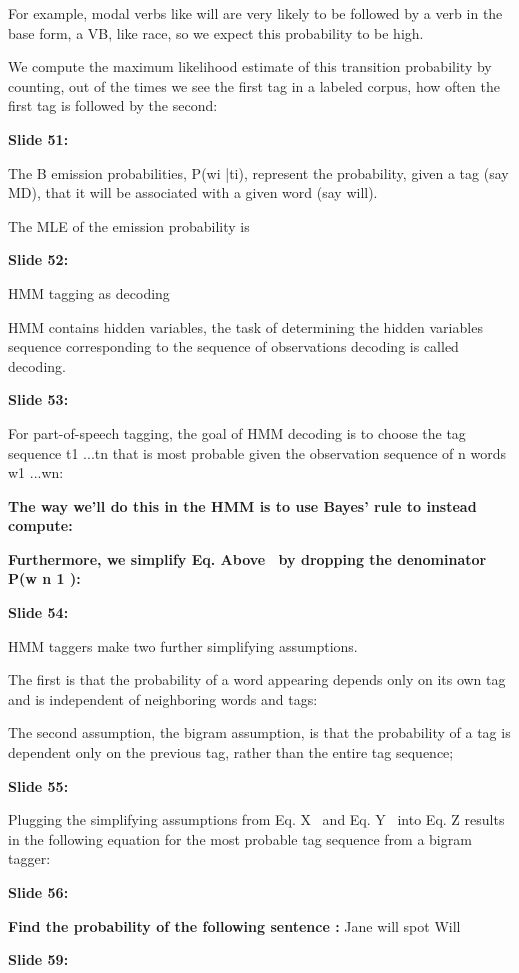 \documentclass[11pt,a4paper]{article}
\begin{document}
For example, modal verbs like will are very likely to be followed by a verb in the base form, a VB, like race, so we expect this probability to be high.

We compute the maximum likelihood estimate of this transition probability by counting, out of the times we see the first tag in a labeled corpus, how often the first tag is followed by the second:

\textbf{Slide 51:}

The B emission probabilities, P(wi |ti), represent the probability, given a tag (say MD), that it will be associated with a given word (say will).

The MLE of the emission probability is

\textbf{Slide 52:}

HMM tagging as decoding

HMM contains hidden variables, the task of determining the hidden variables sequence corresponding to the sequence of observations decoding is called decoding.

\textbf{Slide 53:}

For part-of-speech tagging, the goal of HMM decoding is to choose the tag sequence t1 ...tn that is most probable given the observation sequence of n words w1 ...wn:

\textbf{The way we’ll do this in the HMM is to use Bayes’ rule to instead compute:} 

\textbf{Furthermore, we simplify Eq. Above  by dropping the denominator P(w n 1 ):} 

\textbf{Slide 54:}

HMM taggers make two further simplifying assumptions.

The first is that the probability of a word appearing depends only on its own tag and is independent of neighboring words and tags:

The second assumption, the bigram assumption, is that the probability of a tag is dependent only on the previous tag, rather than the entire tag sequence;

\textbf{Slide 55:}

Plugging the simplifying assumptions from Eq. X  and Eq. Y  into Eq. Z results in the following equation for the most probable tag sequence from a bigram tagger:

\textbf{Slide 56:}

\textbf{Find the probability of the following sentence :} Jane will spot Will

\textbf{Slide 59:}
\end{document}
